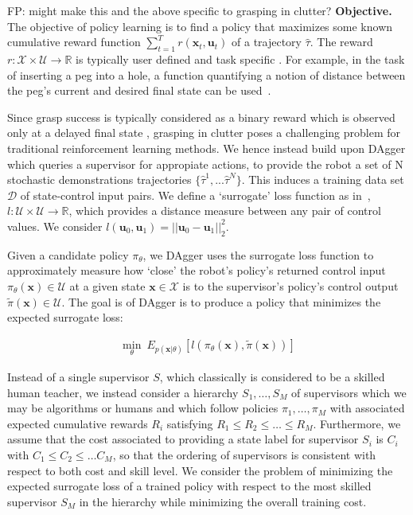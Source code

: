 \documentclass[10pt, conference]{ieeeconf}      %
\newcommand{\bu}{\mathbf{u}}
\newcommand{\bx}{\mathbf{x}}
\begin{document}
{\color{blue} FP: might make this and the above specific to grasping in clutter?}
\noindent\textbf{Objective.} The objective of policy learning is to find a policy that maximizes some known cumulative
reward function $\sum^T_{t=1} r(\bx_t,\bu_t)$ of a trajectory $\hat{\tau}$. The reward $r:\mathcal{X}\times
\mathcal{U}\to \mathbb{R}$ is typically user defined and task specific \cite{1,2,3}. 
For example, in the task of inserting a peg into a hole, a function quantifying a notion of distance between the peg's
current and desired final state can be used~\cite{levine2015end}.  

Since grasp success is typically considered as a binary reward which is observed only at a delayed final state \cite{kitaevphysics}, 
grasping in clutter poses a challenging problem for traditional reinforcement learning methods. We hence instead build
upon DAgger which queries a supervisor for appropiate actions, to provide the robot a set of N stochastic demonstrations trajectories $\lbrace \hat{\tau}^1,...\hat{\tau}^N \rbrace$. This induces a training data set $\mathcal{D}$ of state-control input pairs. 
We define a `surrogate' loss function as in~\cite{ross2010reduction}, $l:\mathcal{U}\times \mathcal{U}\to \mathbb{R}$, which provides a distance
measure between any pair of control values. We consider $l(\bu_0,\bu_1) = ||\bu_0-\bu_1||^2_2$.

Given a candidate policy $\pi_{\theta}$, we DAgger uses the surrogate loss function to approximately measure how `close' the robot's policy's
returned control input $\pi_{\theta}(\bx)\in \mathcal{U}$ at a given state $\bx\in \mathcal{X}$ is to the supervisor's policy's control output
$\tilde{\pi}(\bx)\in \mathcal{U}$. The goal is of DAgger is to produce a policy that minimizes the expected surrogate loss:


 \vspace{-2ex}
\begin{align}\label{eq:LFD_obj}
\underset{\theta}{\min} \: E_{p(\bx|\theta)} [l(\pi_\theta(\bx),\tilde{\pi}(\bx))]
\end{align}

Instead of a single supervisor $S$, which classically is considered to be a skilled human teacher, we instead consider a
hierarchy $S_1, \ldots, S_M$ of supervisors which we may be algorithms or humans and which follow policies $\pi_1, \ldots, \pi_M$ with
associated expected cumulative rewards $R_i$ satisfying $R_1\le R_2 \le \ldots \le
R_M$. Furthermore, we assume that the cost associated to providing a state
label for supervisor $S_i$ is $C_i$ with $C_1\le C_2 \le \ldots C_M$, so that the ordering of supervisors is consistent
with respect to both cost and skill level. We consider the problem of minimizing the expected surrogate loss of a
trained policy with respect to the most skilled supervisor $S_M$ in the hierarchy while minimizing the overall training
cost.
\end{document}
